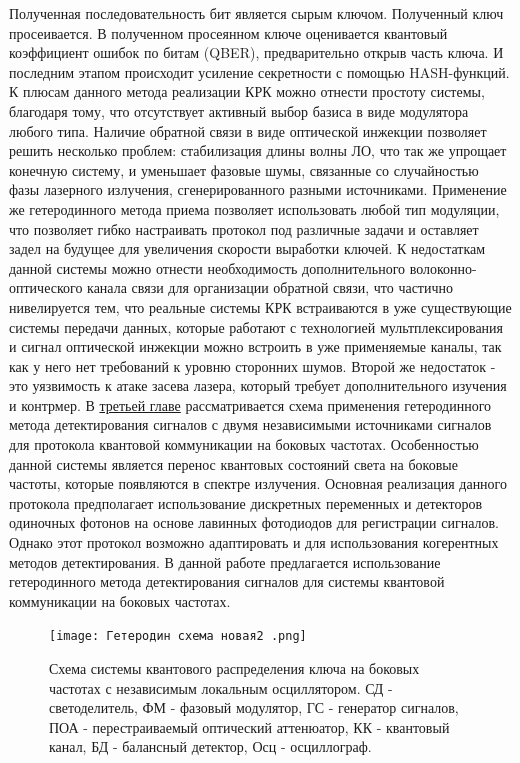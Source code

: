 Полученная последовательность бит является сырым ключом. Полученный ключ просеивается. В полученном просеянном ключе оценивается квантовый коэффициент ошибок по битам (QBER), предварительно открыв часть ключа. И последним этапом происходит усиление секретности  с помощью HASH-функций.
\newline К плюсам данного метода реализации КРК можно отнести простоту системы, благодаря тому, что отсутствует активный выбор базиса в виде модулятора любого типа. Наличие обратной связи в виде оптической инжекции позволяет решить несколько проблем: стабилизация длины волны ЛО, что так же упрощает конечную систему, и уменьшает фазовые шумы, связанные со случайностью фазы лазерного излучения, сгенерированного разными источниками. Применение же гетеродинного метода приема позволяет использовать любой тип модуляции, что позволяет гибко настраивать протокол под различные задачи и оставляет задел на будущее для увеличения скорости выработки ключей.
\newline К недостаткам данной системы можно отнести необходимость дополнительного волоконно-оптического канала связи для организации обратной связи, что частично нивелируется тем, что реальные системы КРК встраиваются в уже существующие системы передачи данных, которые работают с технологией мультплексирования и сигнал оптической инжекции можно встроить в уже применяемые каналы, так как у него нет требований к уровню сторонних шумов. Второй же недостаток - это уязвимость к атаке засева лазера, который требует дополнительного изучения и контрмер. 
\newpage В \underline{третьей главе} рассматривается схема применения гетеродинного метода детектирования сигналов с двумя независимыми источниками сигналов для протокола квантовой коммуникации на боковых частотах. Особенностью данной системы является перенос квантовых состояний света на боковые частоты, которые появляются в спектре излучения. Основная реализация данного протокола предполагает использование дискретных переменных и детекторов одиночных фотонов на основе лавинных фотодиодов для регистрации сигналов. Однако этот протокол возможно адаптировать и для использования когерентных методов детектирования. 
\newline В данной работе предлагается использование гетеродинного метода детектирования сигналов для системы квантовой коммуникации на боковых частотах.
\begin{figure}
    \centering
    \texttt{[image: Гетеродин схема новая2 .png]}
    \caption{Схема системы квантового распределения ключа на боковых частотах с независимым локальным осциллятором. СД - светоделитель, ФМ - фазовый модулятор, ГС - генератор сигналов, ПОА - перестраиваемый оптический аттенюатор, КК - квантовый канал, БД - балансный детектор, Осц - осциллограф.}
    \label{fig:het true scheme}
\end{figure}
